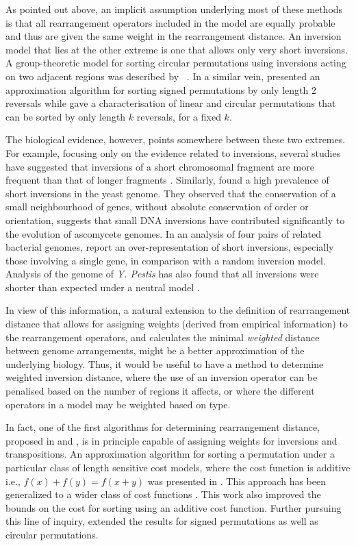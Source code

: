 \documentclass[utf8]{Frontiers_LaTex_Templates/frontiersFPHY} %
\numberwithin{equation}{section}
\begin{document}
As pointed out above, an implicit assumption underlying most of these methods is that all rearrangement operators included in the model are equally probable and thus are given the same weight in the rearrangement distance. 
An inversion model that lies at the other extreme is one that allows only very short inversions. 
A group-theoretic model for sorting circular permutations using inversions acting on two adjacent regions was described by ~\citet{egrinagy2013group}. In a similar vein, \citet{galvao2015sorting} presented an approximation algorithm for sorting signed permutations by only length 2 reversals while \citet{chen1996sorting} gave a characterisation of linear and circular permutations that can be sorted by only length $k$ reversals, for a fixed $k$. 

The biological evidence, however, points somewhere between these two extremes. For example, focusing only on the evidence related to inversions, several studies have suggested that inversions of a short chromosomal fragment are more frequent than that of longer fragments \citep{seoighe2000prevalence, lefebvre2003detection,Darling2008,eisen2000evidence}. Similarly, \citet{seoighe2000prevalence} found a high prevalence of short inversions in the yeast genome. They observed that the conservation of a small neighbourhood of genes, without absolute conservation of order or orientation, suggests that small DNA inversions have contributed significantly to the evolution of ascomycete genomes. In an analysis of four pairs of related bacterial genomes, \citet{lefebvre2003detection} report an over-representation of short inversions, especially those involving a single gene, in comparison with a random inversion model. Analysis of the genome of \emph{Y. Pestis} has also found that all inversions were shorter than expected under a neutral model \citep{Darling2008}.

In view of this information, a natural extension to the definition of rearrangement distance 
that allows for assigning weights (derived from empirical information) to the rearrangement operators, and calculates the minimal \emph{weighted} distance between genome arrangements, might be a better approximation of the underlying biology. 
Thus, it would be useful to have a method to determine weighted inversion distance, where the use of an inversion operator can be penalised based on the number of regions it affects, or where the different operators in a model may be weighted based on type. 

In fact, one of the first algorithms for determining rearrangement distance, proposed in \citet{sankoff1992edit} and \citet{sankoff1992gene}, is in principle capable of assigning weights for inversions and transpositions. An approximation algorithm for sorting a permutation under a particular class of length sensitive cost models, where the cost function is additive i.e., $f(x) + f(y) = f(x+y)$ was presented in \citet{pinter2002genomic}. This approach has been generalized  to a wider class of cost functions \citep{bender2008improved}. This work also improved the bounds on the cost for sorting using an additive cost function. Further pursuing this line of inquiry, \citet{swidan2004sorting} extended the results for signed permutations as well as circular permutations.
\end{document}
